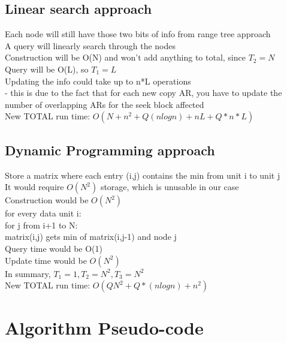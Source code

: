 \documentclass[11pt,psfig]{article}
\begin{document}
\subsection*{Linear search approach}
		Each node will still have those two bits of info from range tree approach\\
		A query will linearly search through the nodes\\
		Construction will be O(N) and won't add anything to total, since $T_2 = N$\\
		Query will be O(L), so $T_1 = L$\\
		Updating the info could take up to n*L operations\\
			- this is due to the fact that for each new copy AR, you have to update 
				the number of overlapping ARs for the seek block affected\\
		New TOTAL run time: $O(N + n^2 + Q(n logn) + nL + Q*n*L)$
\subsection*{Dynamic Programming approach}
		Store a matrix where each entry (i,j) contains the min from unit i to unit j\\
		It would require $O(N^2)$ storage, which is unusable in our case\\
		Construction would be $O(N^2)$\\
			for every data unit i:\\
				for j from i+1 to N:\\
					matrix(i,j) gets min of matrix(i,j-1) and node j\\
		Query time would be O(1)\\
		Update time would be $O(N^2)$\\
		In summary, $T_1=1, T_2=N^2, T_3=N^2$\\
		New TOTAL run time: $O(QN^2 + Q*(n log n) + n^2)$\\

\section*{Algorithm Pseudo-code}
\end{document}
